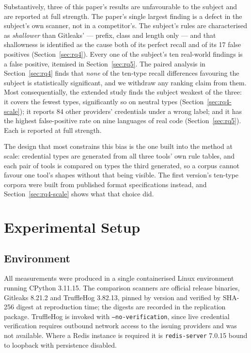 \documentclass[pdflatex,sn-basic]{sn-jnl}
\begin{document}
Substantively, three of this paper's results are unfavourable to the subject and are reported at full strength. The paper's single largest finding is a defect in the subject's own scanner, not in a competitor's. The subject's rules are characterised as \emph{shallower} than Gitleaks' --- prefix, class and length only --- and that shallowness is identified as the cause both of its perfect recall and of its 17 false positives (Section~\ref{sec:rq4}). Every one of the subject's ten real-world findings is a false positive, itemised in Section~\ref{sec:rq5}. The paired analysis in Section~\ref{sec:rq4} finds that \emph{none} of the ten-type recall differences favouring the subject is statistically significant, and we withdraw any ranking claim from them. Most consequentially, the extended study finds the subject weakest of the three: it covers the fewest types, significantly so on neutral types (Section~\ref{sec:rq4-scale}); it reports 84 other providers' credentials under a wrong label; and it has the highest false-positive rate on nine languages of real code (Section~\ref{sec:rq5}). Each is reported at full strength.

The design that most constrains this bias is the one built into the method at scale: credential types are generated from all three tools' own rule tables, and each pair of tools is compared on types the third generated, so a corpus cannot favour one tool's shapes without that being visible. The first version's ten-type corpora were built from published format specifications instead, and Section~\ref{sec:rq4-scale} shows what that choice did.

\section{Experimental Setup}
\label{sec:setup}

\subsection{Environment}

All measurements were produced in a single containerised Linux environment running CPython 3.11.15. The comparison scanners are official release binaries, Gitleaks 8.21.2 and TruffleHog 3.82.13, pinned by version and verified by SHA-256 digest at reproduction time; the digests are recorded in the replication package. TruffleHog is invoked with \texttt{--no-verification}, since live credential verification requires outbound network access to the issuing providers and was not available. Where a Redis instance is required it is \texttt{redis-server} 7.0.15 bound to loopback with persistence disabled.
\end{document}
